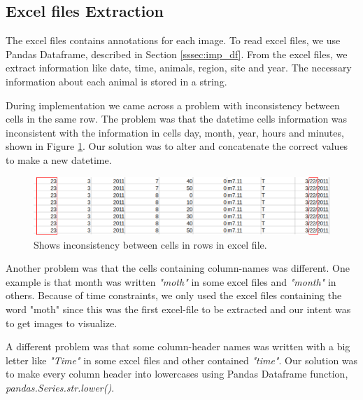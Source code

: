 \documentclass[USenglish]{uit-thesis}
\begin{document}


\subsection{Excel files Extraction} \label{ssec:imp_excel}
The excel files contains annotations for each image. To read excel files, we use Pandas Dataframe, described in Section \ref{sssec:imp_df}. From the excel files, we extract information like date, time, animals, region, site and year. The necessary information about each animal is stored in a string.

During implementation we came across a problem with inconsistency between cells in the same row. The problem was that the datetime cells information was inconsistent with the information in cells day, month, year, hours and minutes, shown in Figure \ref{fig:inconsistency}. Our solution was to alter and concatenate the correct values to make a new datetime.

\begin{figure}[b]
\centering
\includegraphics[width=\textwidth]{inconsistency2.png}
\caption{Shows inconsistency between cells in rows in excel file.}
\label{fig:inconsistency}
\end{figure}


Another problem was that the cells containing column-names was different. One example is that month was written \textit{"moth"} in some excel files and \textit{"month"} in others. Because of time constraints, we only used the excel files containing the word "moth" since this was the first excel-file to be extracted and our intent was to get images to visualize. 

A different problem was that some column-header names was written with a big letter like \textit{"Time"} in some excel files and other contained \textit{"time"}. Our solution was to make every column header into lowercases using Pandas Dataframe function, \textit{pandas.Series.str.lower()}.
\end{document}
